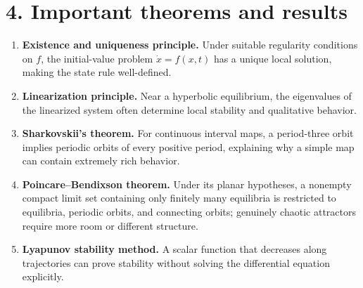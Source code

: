 \section*{4. Important theorems and results}
\begin{enumerate}[leftmargin=*,itemsep=0.35em]

\item \textbf{Existence and uniqueness principle.} Under suitable regularity conditions on $f$, the initial-value problem $\dot x=f(x,t)$ has a unique local solution, making the state rule well-defined. \cite{dynamical_systems_theory_ref2}

\item \textbf{Linearization principle.} Near a hyperbolic equilibrium, the eigenvalues of the linearized system often determine local stability and qualitative behavior. \cite{dynamical_systems_theory_ref1}

\item \textbf{Sharkovskii's theorem.} For continuous interval maps, a period-three orbit implies periodic orbits of every positive period, explaining why a simple map can contain extremely rich behavior. \cite{dynamical_systems_theory_ref3}

\item \textbf{Poincare--Bendixson theorem.} Under its planar hypotheses, a nonempty compact limit set containing only finitely many equilibria is restricted to equilibria, periodic orbits, and connecting orbits; genuinely chaotic attractors require more room or different structure. \cite{dynamical_systems_theory_ref1}

\item \textbf{Lyapunov stability method.} A scalar function that decreases along trajectories can prove stability without solving the differential equation explicitly. \cite{dynamical_systems_theory_ref5}
\end{enumerate}

\theoryapplications
{}
